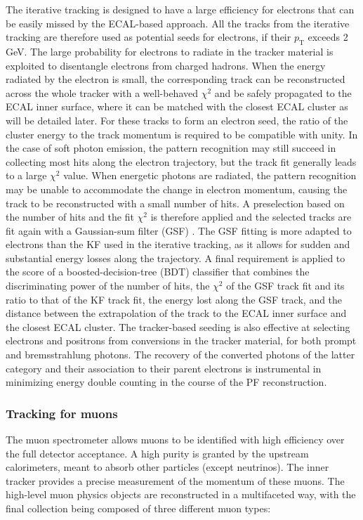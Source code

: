 The iterative tracking is designed to have a large efficiency for electrons that can be easily missed by the ECAL-based approach. All the tracks from the iterative tracking are therefore used as potential seeds for electrons, if their $p_{\mathrm{T}}$ exceeds 2 GeV. The large probability for electrons to radiate in the tracker material is exploited to disentangle electrons from charged hadrons. When the energy radiated by the electron is small, the corresponding track can be reconstructed across the whole tracker with a well-behaved $\chi^2$ and be safely propagated to the ECAL inner surface, where it can be matched with the closest ECAL cluster as will be detailed later.  For these tracks to form an electron seed, the ratio of the cluster energy to the track momentum is required to be compatible with unity. In the case of soft photon emission, the pattern recognition may still succeed in collecting most hits along the electron trajectory, but the track fit generally leads to a large $\chi^2$ value.  When energetic photons are radiated, the pattern recognition may be unable to accommodate the change in electron momentum, causing the track to be reconstructed with a small number of hits. A preselection based on the number of hits and the fit $\chi^2$ is therefore applied and the selected tracks are fit again with a Gaussian-sum filter (GSF) \cite{Adam_2005}. The GSF fitting is more adapted to electrons than the KF used in the iterative tracking, as it allows for sudden and substantial energy losses along the trajectory. A final requirement is applied to the score of a boosted-decision-tree (BDT) classifier that combines the discriminating power of the number of hits, the $\chi^2$ of the GSF track fit and its ratio to that of the KF track fit, the energy lost along the GSF track, and the distance between the extrapolation of the track to the ECAL inner surface and the closest ECAL cluster. The tracker-based seeding is also effective at selecting electrons and positrons from conversions in the tracker material, for both prompt and bremsstrahlung photons.  The recovery of the converted photons of the latter category and their association to their parent electrons is instrumental in minimizing energy double counting in the course of the PF reconstruction.


\subsubsection{Tracking for muons}

 The  muon  spectrometer  allows muons to be identified with high efficiency over the full detector acceptance.  A high purity is granted by the upstream calorimeters, meant to absorb other particles (except neutrinos).  The inner tracker provides a precise measurement of the momentum of these muons.  The high-level muon physics objects are reconstructed in a multifaceted way, with the final collection being composed of three different muon types:
 

